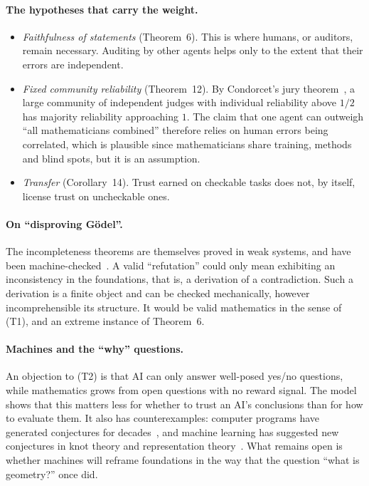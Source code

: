 \documentclass[11pt]{article}
\theoremstyle{definition}
\theoremstyle{remark}
\begin{document}
\paragraph{The hypotheses that carry the weight.}
\begin{itemize}
\item \emph{Faithfulness of statements} (Theorem~6). This is where humans, or auditors, remain
necessary. Auditing by other agents helps only to the extent that their errors are independent.
\item \emph{Fixed community reliability} (Theorem~12). By Condorcet's jury
theorem~\cite{condorcet}, a large community of independent judges with individual reliability
above $1/2$ has majority reliability approaching $1$. The claim that one agent can outweigh
``all mathematicians combined'' therefore relies on human errors being correlated, which is
plausible since mathematicians share training, methods and blind spots, but it is an
assumption.
\item \emph{Transfer} (Corollary~14). Trust earned on checkable tasks does not, by itself,
license trust on uncheckable ones.
\end{itemize}

\paragraph{On ``disproving G\"odel''.} The incompleteness theorems are themselves proved in
weak systems, and have been machine-checked~\cite{paulson}. A valid ``refutation'' could only
mean exhibiting an inconsistency in the foundations, that is, a derivation of a contradiction.
Such a derivation is a finite object and can be checked mechanically, however incomprehensible
its structure. It would be valid mathematics in the sense of (T1), and an extreme instance of
Theorem~6.

\paragraph{Machines and the ``why'' questions.} An objection to (T2) is that AI can only answer
well-posed yes/no questions, while mathematics grows from open questions with no reward signal.
The model shows that this matters less for whether to trust an AI's conclusions than for how
to evaluate them. It also has counterexamples: computer programs have generated conjectures for
decades~\cite{graffiti}, and machine learning has suggested new conjectures in knot theory and
representation theory~\cite{davies}. What remains open is whether machines will reframe
foundations in the way that the question ``what is geometry?'' once did.
\end{document}
